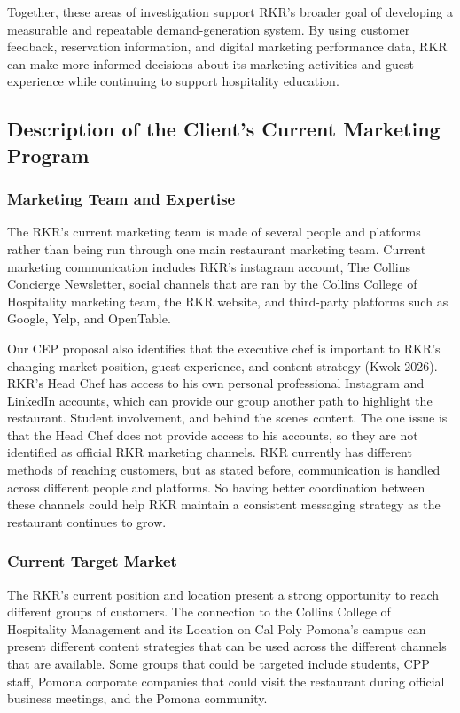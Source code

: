 \documentclass[
  12pt,
  letterpaper,
  DIV=11,
  numbers=noendperiod]{scrartcl}
\begin{document}
Together, these areas of investigation support RKR's broader goal of
developing a measurable and repeatable demand-generation system. By
using customer feedback, reservation information, and digital marketing
performance data, RKR can make more informed decisions about its
marketing activities and guest experience while continuing to support
hospitality education.

\subsection{Description of the Client's Current Marketing
Program}\label{description-of-the-clients-current-marketing-program}

\subsubsection{Marketing Team and
Expertise}\label{marketing-team-and-expertise}

The RKR's current marketing team is made of several people and platforms
rather than being run through one main restaurant marketing team.
Current marketing communication includes RKR's instagram account, The
Collins Concierge Newsletter, social channels that are ran by the
Collins College of Hospitality marketing team, the RKR website, and
third-party platforms such as Google, Yelp, and OpenTable.

Our CEP proposal also identifies that the executive chef is important to
RKR's changing market position, guest experience, and content strategy
(Kwok 2026). RKR's Head Chef has access to his own personal professional
Instagram and LinkedIn accounts, which can provide our group another
path to highlight the restaurant. Student involvement, and behind the
scenes content. The one issue is that the Head Chef does not provide
access to his accounts, so they are not identified as official RKR
marketing channels. RKR currently has different methods of reaching
customers, but as stated before, communication is handled across
different people and platforms. So having better coordination between
these channels could help RKR maintain a consistent messaging strategy
as the restaurant continues to grow.~~

\subsubsection{Current Target Market}\label{current-target-market}

The RKR's current position and location present a strong opportunity to
reach different groups of customers. The connection to the Collins
College of Hospitality Management and its Location on Cal Poly Pomona's
campus can present different content strategies that can be used across
the different channels that are available. Some groups that could be
targeted include students, CPP staff, Pomona corporate companies that
could visit the restaurant during official business meetings, and the
Pomona community.~
\end{document}
